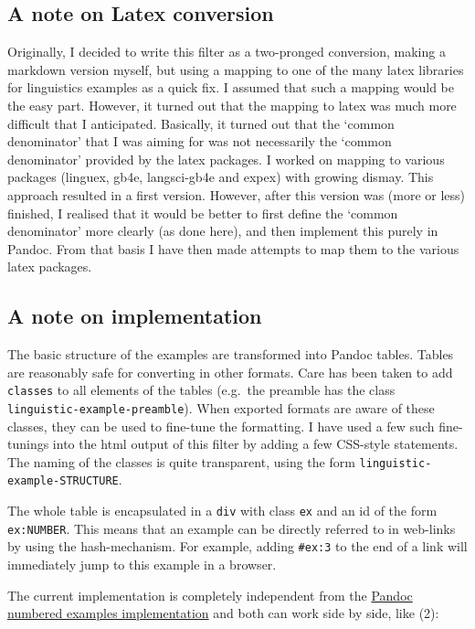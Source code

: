 \documentclass[
]{article}
\begin{document}
\hypertarget{a-note-on-latex-conversion}{%
\subsection{A note on Latex
conversion}\label{a-note-on-latex-conversion}}

Originally, I decided to write this filter as a two-pronged conversion,
making a markdown version myself, but using a mapping to one of the many
latex libraries for linguistics examples as a quick fix. I assumed that
such a mapping would be the easy part. However, it turned out that the
mapping to latex was much more difficult that I anticipated. Basically,
it turned out that the `common denominator' that I was aiming for was
not necessarily the `common denominator' provided by the latex packages.
I worked on mapping to various packages (linguex, gb4e, langsci-gb4e and
expex) with growing dismay. This approach resulted in a first version.
However, after this version was (more or less) finished, I realised that
it would be better to first define the `common denominator' more clearly
(as done here), and then implement this purely in Pandoc. From that
basis I have then made attempts to map them to the various latex
packages.

\hypertarget{a-note-on-implementation}{%
\subsection{A note on implementation}\label{a-note-on-implementation}}

The basic structure of the examples are transformed into Pandoc tables.
Tables are reasonably safe for converting in other formats. Care has
been taken to add \texttt{classes} to all elements of the tables
(e.g.~the preamble has the class \texttt{linguistic-example-preamble}).
When exported formats are aware of these classes, they can be used to
fine-tune the formatting. I have used a few such fine-tunings into the
html output of this filter by adding a few CSS-style statements. The
naming of the classes is quite transparent, using the form
\texttt{linguistic-example-STRUCTURE}.

The whole table is encapsulated in a \texttt{div} with class \texttt{ex}
and an id of the form \texttt{ex:NUMBER}. This means that an example can
be directly referred to in web-links by using the hash-mechanism. For
example, adding \texttt{\#ex:3} to the end of a link will immediately
jump to this example in a browser.

The current implementation is completely independent from the
\href{https://pandoc.org/MANUAL.html\#numbered-example-lists}{Pandoc
numbered examples implementation} and both can work side by side, like
(2):
\end{document}
